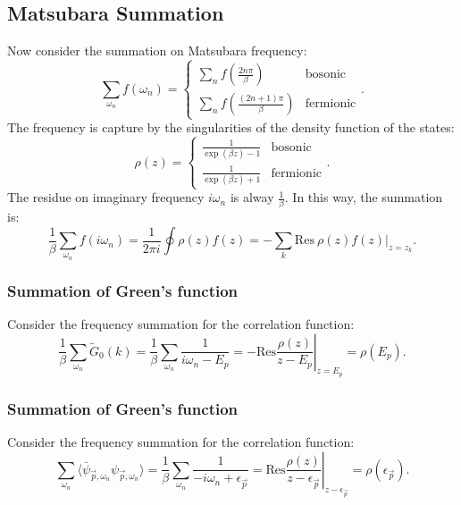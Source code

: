 \documentclass[aps,prb,superscriptaddress,nofootinbib]{revtex4}
\begin{document}
\subsection{Matsubara Summation}
Now consider the summation on Matsubara frequency:
\begin{equation}
	\sum_{\omega_n} f(\omega_n) = 
	\begin{cases}
		\sum_n f(\frac{2n\pi}{\beta}) & \mathrm{bosonic} \\
		\sum_n f(\frac{(2n+1)\pi}{\beta}) & \mathrm{fermionic}
	\end{cases}.
\end{equation}
The frequency is capture by the singularities of the density function of the states:
\begin{equation}
	\rho(z) = \begin{cases}
		\frac{1}{\exp(\beta z)-1} & \mathrm{bosonic} \\
		\frac{1}{\exp(\beta z)+1} & \mathrm{fermionic}
	\end{cases}.
\end{equation}
The residue on imaginary frequency $i\omega_n$ is alway $\frac{1}{\beta}$. In this way, the summation is:
\begin{equation}
	\frac{1}{\beta}\sum_{\omega_n} f(i\omega_n) 
	= \frac{1}{2\pi i} \oint \rho(z)f(z)
	= -\sum_{k} \mathrm{Res}\ \rho(z)f(z)|_{z=z_k}.
\end{equation}

\subsubsection*{Summation of Green's function}
Consider the frequency summation for the correlation function:
\begin{equation}
	\frac{1}{\beta}\sum_{\omega_n} \tilde{G}_0(k) 
	= \frac{1}{\beta}\sum_{\omega_n}\frac{1}{i\omega_n-E_{p}}
	= -\mathrm{Res} \left. \frac{\rho(z)}{z-E_{p}}\right|_{z=E_{p}}
	= \rho(E_{p}).
\end{equation}


\subsubsection*{Summation of Green's function}
Consider the frequency summation for the correlation function:
\begin{equation}
	\sum_{\omega_n} \langle\bar\psi_{\vec p,\omega_n}\psi_{\vec p, \omega_n}\rangle = \frac{1}{\beta}\sum_{\omega_n}\frac{1}{-i\omega_n+\epsilon_{\vec p}}
	= \mathrm{Res} \left. \frac{\rho(z)}{z-\epsilon_{\vec p}}\right|_{z-\epsilon_{\vec p}}
	= \rho(\epsilon_{\vec p}).
\end{equation}
\end{document}
